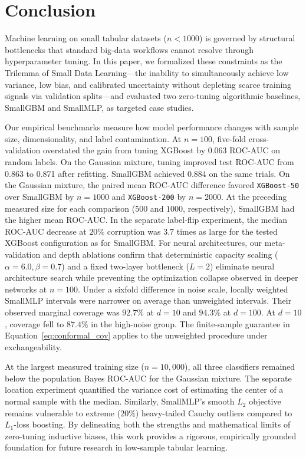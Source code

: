 \documentclass{article}
\begin{document}
\section{Conclusion}
\label{sec:conclusion}

Machine learning on small tabular datasets ($n < 1000$) is governed by structural bottlenecks that standard big-data workflows cannot resolve through hyperparameter tuning. In this paper, we formalized these constraints as the Trilemma of Small Data Learning—the inability to simultaneously achieve low variance, low bias, and calibrated uncertainty without depleting scarce training signals via validation splits—and evaluated two zero-tuning algorithmic baselines, SmallGBM and SmallMLP, as targeted case studies.

Our empirical benchmarks measure how model performance changes with sample size, dimensionality, and label contamination. At $n=100$, five-fold cross-validation overstated the gain from tuning XGBoost by 0.063 ROC-AUC on random labels. On the Gaussian mixture, tuning improved test ROC-AUC from 0.863 to 0.871 after refitting. SmallGBM achieved 0.884 on the same trials. On the Gaussian mixture, the paired mean ROC-AUC difference favored \texttt{XGBoost-50} over SmallGBM by $n=1000$ and \texttt{XGBoost-200} by $n=2000$. At the preceding measured size for each comparison ($500$ and $1000$, respectively), SmallGBM had the higher mean ROC-AUC. In the separate label-flip experiment, the median ROC-AUC decrease at $20\%$ corruption was $3.7$ times as large for the tested XGBoost configuration as for SmallGBM. For neural architectures, our meta-validation and depth ablations confirm that deterministic capacity scaling ($\alpha = 6.0, \beta = 0.7$) and a fixed two-layer bottleneck ($L = 2$) eliminate neural architecture search while preventing the optimization collapse observed in deeper networks at $n = 100$. Under a sixfold difference in noise scale, locally weighted SmallMLP intervals were narrower on average than unweighted intervals. Their observed marginal coverage was $92.7\%$ at $d=10$ and $94.3\%$ at $d=100$. At $d=10$, coverage fell to $87.4\%$ in the high-noise group. The finite-sample guarantee in Equation~\eqref{eq:conformal_cov} applies to the unweighted procedure under exchangeability.

At the largest measured training size ($n=10{,}000$), all three classifiers remained below the population Bayes ROC-AUC for the Gaussian mixture. The separate location experiment quantified the variance cost of estimating the center of a normal sample with the median. Similarly, SmallMLP's smooth $L_2$ objective remains vulnerable to extreme ($20\%$) heavy-tailed Cauchy outliers compared to $L_1$-loss boosting. By delineating both the strengths and mathematical limits of zero-tuning inductive biases, this work provides a rigorous, empirically grounded foundation for future research in low-sample tabular learning.
\end{document}
